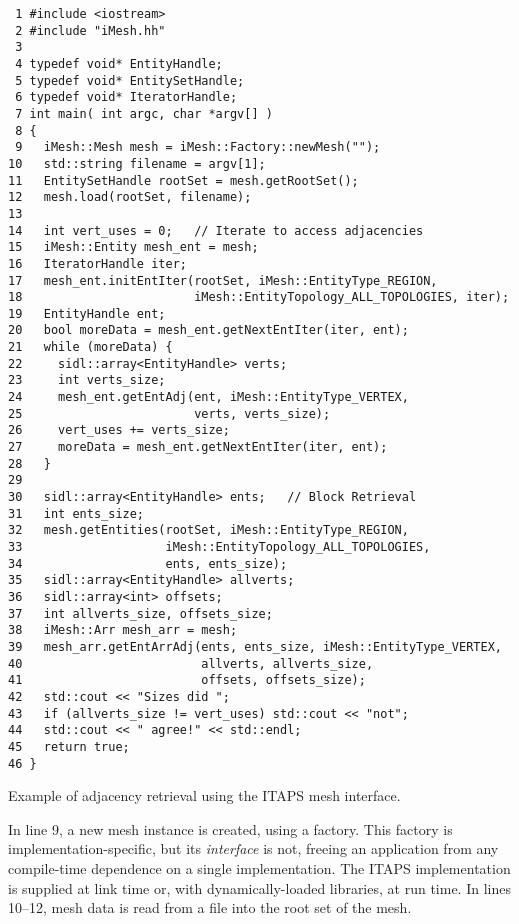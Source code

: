 \begin{algorithm}
\begin{verbatim}
 1 #include <iostream>
 2 #include "iMesh.hh"
 3
 4 typedef void* EntityHandle;
 5 typedef void* EntitySetHandle;
 6 typedef void* IteratorHandle;
 7 int main( int argc, char *argv[] )
 8 {
 9   iMesh::Mesh mesh = iMesh::Factory::newMesh("");
10   std::string filename = argv[1];
11   EntitySetHandle rootSet = mesh.getRootSet();
12   mesh.load(rootSet, filename);
13
14   int vert_uses = 0;   // Iterate to access adjacencies
15   iMesh::Entity mesh_ent = mesh;
16   IteratorHandle iter;
17   mesh_ent.initEntIter(rootSet, iMesh::EntityType_REGION, 
18                        iMesh::EntityTopology_ALL_TOPOLOGIES, iter);
19   EntityHandle ent;
20   bool moreData = mesh_ent.getNextEntIter(iter, ent);
21   while (moreData) {
22     sidl::array<EntityHandle> verts;
23     int verts_size;
24     mesh_ent.getEntAdj(ent, iMesh::EntityType_VERTEX,
25                        verts, verts_size);
26     vert_uses += verts_size;
27     moreData = mesh_ent.getNextEntIter(iter, ent);
28   }
29
30   sidl::array<EntityHandle> ents;   // Block Retrieval
31   int ents_size;
32   mesh.getEntities(rootSet, iMesh::EntityType_REGION, 
33                    iMesh::EntityTopology_ALL_TOPOLOGIES,
34                    ents, ents_size);
35   sidl::array<EntityHandle> allverts;
36   sidl::array<int> offsets;
37   int allverts_size, offsets_size;
38   iMesh::Arr mesh_arr = mesh;
39   mesh_arr.getEntArrAdj(ents, ents_size, iMesh::EntityType_VERTEX,
40                         allverts, allverts_size,
41                         offsets, offsets_size);
42   std::cout << "Sizes did ";
43   if (allverts_size != vert_uses) std::cout << "not";
44   std::cout << " agree!" << std::endl;
45   return true;
46 }
\end{verbatim}
\caption{Example of adjacency retrieval using the ITAPS mesh interface.}\label{ex:adjacency}
\end{algorithm}

In line 9, a new mesh instance is created, using a factory.
This factory is implementation-specific, but its {\em interface} is not,
freeing an application from any compile-time dependence on a single
implementation.  The ITAPS implementation is supplied at link time or,
with dynamically-loaded libraries, at run time.  In lines 10--12, mesh
data is read from a file into the root set of the mesh.

